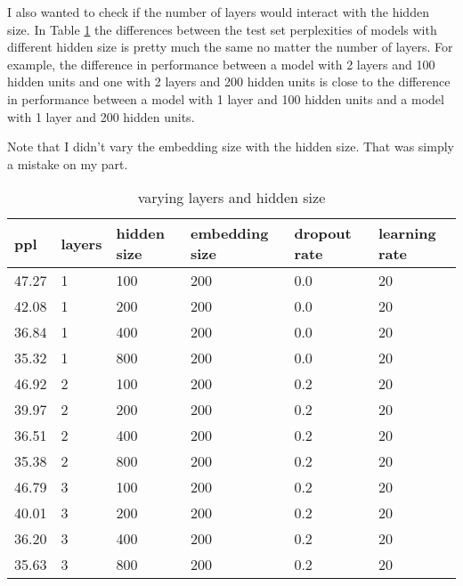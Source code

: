 \documentclass{article}
\begin{document}
I also wanted to check if the number of layers would interact with the hidden size. In Table \ref{Table 2} the differences between the test set perplexities of models with different hidden size is pretty much the same no matter the number of layers. For example, the difference in performance between a model with 2 layers and 100 hidden units and one with 2 layers and 200 hidden units is close to the difference in performance between a model with 1 layer and 100 hidden units and a model with 1 layer and 200 hidden units. 

Note that I didn't vary the embedding size with the hidden size. That was simply a mistake on my part. 
\begin{table}[]
\centering
\begin{tabular}{@{}llllll@{}}
\toprule
ppl   & layers & hidden size & embedding size & dropout rate & learning rate \\ \midrule 
47.27 & 1      & 100         & 200            & 0.0          & 20            \\
42.08 & 1      & 200         & 200            & 0.0          & 20            \\
36.84 & 1      & 400         & 200            & 0.0          & 20            \\
35.32 & 1      & 800         & 200            & 0.0          & 20            \\ \midrule
46.92 & 2      & 100         & 200            & 0.2          & 20            \\
39.97 & 2      & 200         & 200            & 0.2          & 20            \\ %
36.51 & 2      & 400         & 200            & 0.2          & 20            \\
35.38 & 2      & 800         & 200            & 0.2          & 20            \\ \midrule
46.79 & 3      & 100         & 200            & 0.2          & 20            \\
40.01 & 3      & 200         & 200            & 0.2          & 20            \\
36.20 & 3      & 400         & 200            & 0.2          & 20            \\
35.63 & 3      & 800         & 200            & 0.2          & 20            \\ \bottomrule
\end{tabular}
\caption{varying layers and hidden size}
\label{Table 2}
\end{table}
\end{document}
